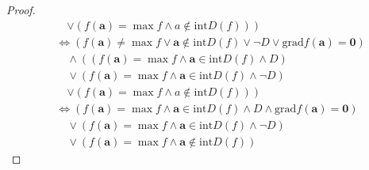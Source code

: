 \documentclass[dvipdfmx]{jsarticle}
\begin{document}
\begin{proof}
\begin{align*}
&\quad \left. \vee \left( f\left( \mathbf{a} \right) = \max f \land a \notin \mathrm{int}{D(f)} \right) \right)\\
&\Leftrightarrow \left( f\left( \mathbf{a} \right) \neq \max f \vee \mathbf{a} \notin \mathrm{int}{D(f)} \vee \neg D \vee \mathrm{grad}f\left( \mathbf{a} \right) = \mathbf{0} \right) \\
&\quad \land \left( \left( f\left( \mathbf{a} \right) = \max f \land \mathbf{a} \in \mathrm{int}{D(f)} \land D \right) \right. \\
&\quad \vee \left( f\left( \mathbf{a} \right) = \max f \land \mathbf{a} \in \mathrm{int}{D(f)} \land \neg D \right) \\
&\quad \left. \vee \left( f\left( \mathbf{a} \right) = \max f \land a \notin \mathrm{int}{D(f)} \right) \right)\\
&\Leftrightarrow \left( f\left( \mathbf{a} \right) = \max f \land \mathbf{a} \in \mathrm{int}{D(f)} \land D \land \mathrm{grad}f\left( \mathbf{a} \right) = \mathbf{0} \right) \\
&\quad \vee \left( f\left( \mathbf{a} \right) = \max f \land \mathbf{a} \in \mathrm{int}{D(f)} \land \neg D \right) \\
&\quad \vee \left( f\left( \mathbf{a} \right) = \max f \land \mathbf{a} \notin \mathrm{int}{D(f)} \right)
\end{align*}
\end{proof}
\end{document}
